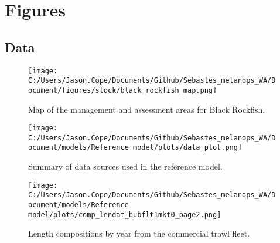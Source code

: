 \documentclass[11pt,
  english,
  letterpaper,
]{article}
\begin{document}
\newpage





\newpage













\newpage



\clearpage

\clearpage


\hypertarget{figures}{%
\section{Figures}\label{figures}}

\hypertarget{data}{%
\subsection{Data}\label{data}}

\begin{figure}
\centering
\texttt{[image: C:/Users/Jason.Cope/Documents/Github/Sebastes\_melanops\_WA/Document/figures/stock/black\_rockfish\_map.png]}
\caption{Map of the management and assessment areas for Black Rockfish.\label{fig:map}}
\end{figure}

\pagebreak

\begin{figure}
\centering
\texttt{[image: C:/Users/Jason.Cope/Documents/Github/Sebastes\_melanops\_WA/Document/models/Reference model/plots/data\_plot.png]}
\caption{Summary of data sources used in the reference model.\label{fig:data-plot}}
\end{figure}

\pagebreak

\begin{figure}
\centering
\texttt{[image: C:/Users/Jason.Cope/Documents/Github/Sebastes\_melanops\_WA/Document/models/Reference model/plots/comp\_lendat\_bubflt1mkt0\_page2.png]}
\caption{Length compositions by year from the commercial trawl fleet.\label{fig:trawl-length-comps}}
\end{figure}
\end{document}
